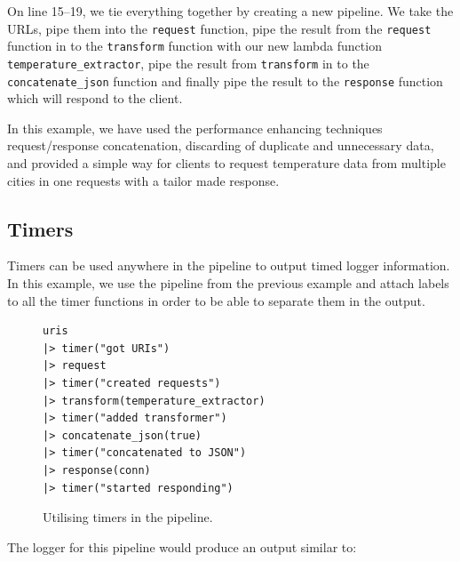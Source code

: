 \documentclass{cslthse-msc}
\begin{document}
On line 15--19, we tie everything together by creating a new pipeline. We take the URLs, pipe them into the \lstinline{request} function, pipe the result from the \lstinline{request} function in to the \lstinline{transform} function with our new lambda function \lstinline{temperature_extractor}, pipe the result from \lstinline{transform} in to the \lstinline{concatenate_json} function and finally pipe the result to the \lstinline{response} function which will respond to the client.

In this example, we have used the performance enhancing techniques request/response concatenation, discarding of duplicate and unnecessary data, and provided a simple way for clients to request temperature data from multiple cities in one requests with a tailor made response.

\subsection{Timers}
Timers can be used anywhere in the pipeline to output timed logger information. In this example, we use the pipeline from the previous example and attach labels to all the timer functions in order to be able to separate them in the output.

\begin{figure}[H]
  \centering
\begin{lstlisting}[breaklines=true,frame=single]
uris
|> timer("got URIs")
|> request
|> timer("created requests")
|> transform(temperature_extractor)
|> timer("added transformer")
|> concatenate_json(true)
|> timer("concatenated to JSON")
|> response(conn)
|> timer("started responding")
\end{lstlisting}
  \caption{Utilising timers in the pipeline.}
\end{figure}

\noindent The logger for this pipeline would produce an output similar to:
\end{document}
